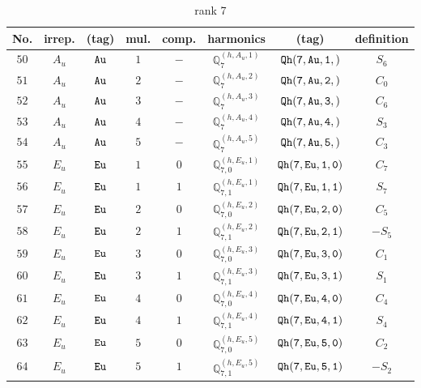 \documentclass[fleqn,8pt]{jsarticle}
\begin{document}
\begin{table}[ht!]
\begin{center}
\caption{rank 7}
\renewcommand{\arraystretch}{1.3}
\begin{tabular}{cccccccc} \hline \hline
No. & irrep. & (tag) & mul. & comp. & harmonics & (tag) & definition \\ \hline
$ 50 $ & $ A_{u} $ & $ {\tt Au} $ & $ 1 $ & $ - $ & $ \mathbb{Q}_{7}^{(h,A_{u},1)} $ & $ {\tt Qh(7,Au,1,)} $ & $ S_{6} $ \\
$ 51 $ & $ A_{u} $ & $ {\tt Au} $ & $ 2 $ & $ - $ & $ \mathbb{Q}_{7}^{(h,A_{u},2)} $ & $ {\tt Qh(7,Au,2,)} $ & $ C_{0} $ \\
$ 52 $ & $ A_{u} $ & $ {\tt Au} $ & $ 3 $ & $ - $ & $ \mathbb{Q}_{7}^{(h,A_{u},3)} $ & $ {\tt Qh(7,Au,3,)} $ & $ C_{6} $ \\
$ 53 $ & $ A_{u} $ & $ {\tt Au} $ & $ 4 $ & $ - $ & $ \mathbb{Q}_{7}^{(h,A_{u},4)} $ & $ {\tt Qh(7,Au,4,)} $ & $ S_{3} $ \\
$ 54 $ & $ A_{u} $ & $ {\tt Au} $ & $ 5 $ & $ - $ & $ \mathbb{Q}_{7}^{(h,A_{u},5)} $ & $ {\tt Qh(7,Au,5,)} $ & $ C_{3} $ \\
$ 55 $ & $ E_{u} $ & $ {\tt Eu} $ & $ 1 $ & $ 0 $ & $ \mathbb{Q}_{7,0}^{(h,E_{u},1)} $ & $ {\tt Qh(7,Eu,1,0)} $ & $ C_{7} $ \\
$ 56 $ & $ E_{u} $ & $ {\tt Eu} $ & $ 1 $ & $ 1 $ & $ \mathbb{Q}_{7,1}^{(h,E_{u},1)} $ & $ {\tt Qh(7,Eu,1,1)} $ & $ S_{7} $ \\
$ 57 $ & $ E_{u} $ & $ {\tt Eu} $ & $ 2 $ & $ 0 $ & $ \mathbb{Q}_{7,0}^{(h,E_{u},2)} $ & $ {\tt Qh(7,Eu,2,0)} $ & $ C_{5} $ \\
$ 58 $ & $ E_{u} $ & $ {\tt Eu} $ & $ 2 $ & $ 1 $ & $ \mathbb{Q}_{7,1}^{(h,E_{u},2)} $ & $ {\tt Qh(7,Eu,2,1)} $ & $ - S_{5} $ \\
$ 59 $ & $ E_{u} $ & $ {\tt Eu} $ & $ 3 $ & $ 0 $ & $ \mathbb{Q}_{7,0}^{(h,E_{u},3)} $ & $ {\tt Qh(7,Eu,3,0)} $ & $ C_{1} $ \\
$ 60 $ & $ E_{u} $ & $ {\tt Eu} $ & $ 3 $ & $ 1 $ & $ \mathbb{Q}_{7,1}^{(h,E_{u},3)} $ & $ {\tt Qh(7,Eu,3,1)} $ & $ S_{1} $ \\
$ 61 $ & $ E_{u} $ & $ {\tt Eu} $ & $ 4 $ & $ 0 $ & $ \mathbb{Q}_{7,0}^{(h,E_{u},4)} $ & $ {\tt Qh(7,Eu,4,0)} $ & $ C_{4} $ \\
$ 62 $ & $ E_{u} $ & $ {\tt Eu} $ & $ 4 $ & $ 1 $ & $ \mathbb{Q}_{7,1}^{(h,E_{u},4)} $ & $ {\tt Qh(7,Eu,4,1)} $ & $ S_{4} $ \\
$ 63 $ & $ E_{u} $ & $ {\tt Eu} $ & $ 5 $ & $ 0 $ & $ \mathbb{Q}_{7,0}^{(h,E_{u},5)} $ & $ {\tt Qh(7,Eu,5,0)} $ & $ C_{2} $ \\
$ 64 $ & $ E_{u} $ & $ {\tt Eu} $ & $ 5 $ & $ 1 $ & $ \mathbb{Q}_{7,1}^{(h,E_{u},5)} $ & $ {\tt Qh(7,Eu,5,1)} $ & $ - S_{2} $ \\
 \hline \hline
\end{tabular}
\end{center}
\end{table}
\end{document}
